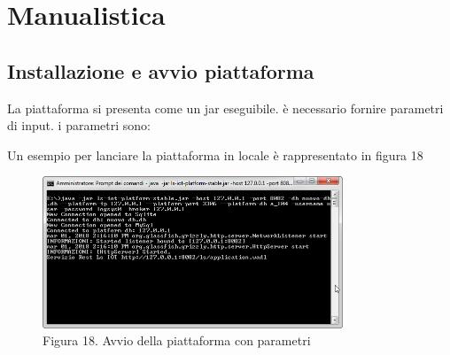 \section{Manualistica}
\subsection{Installazione e avvio piattaforma}
La piattaforma si presenta come un jar eseguibile. è necessario fornire parametri di input. i parametri sono:
{\selectfont
	
}
Un esempio per lanciare la piattaforma in locale è rappresentato in figura 18
\begin{figure}[h]
			\centering
			\includegraphics[width=0.8\textwidth]{lancio-piattaforma.png}
			\caption*{Figura 18. Avvio della piattaforma con parametri}
\end{figure}
